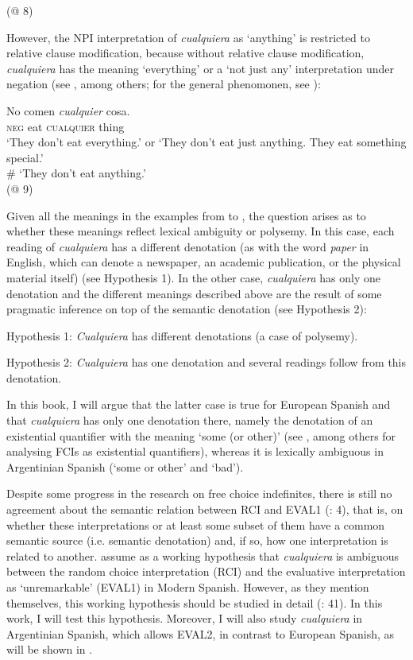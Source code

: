     (@ 8)
\z

However, the NPI interpretation of \textit{cualquiera} as ‘anything’ is restricted to relative clause modification, because without relative clause modification, \textit{cualquiera} has the meaning ‘everything’ or a ‘not just any’ interpretation under negation (see \citealt{Arregui2006}, among others; for the general phenomonen, see \citealt{Chierchia2006}):

\ea \label{ex:key:17}
    \gll No comen \textit{cualquier} cosa.\\
    \textsc{neg} eat \textsc{cualquier} thing\\
    \glt ‘They don’t eat everything.’ or ‘They don’t eat just anything. They eat something special.’\\
    \# ‘They don’t eat anything.’ \\
    (@ 9)
\z

Given all the meanings in the examples from  to , the question arises as to whether these meanings reflect lexical ambiguity or polysemy. In this case, each reading of \textit{cualquiera} has a different denotation (as with the word \textit{paper} in English, which can denote a newspaper, an academic publication, or the physical material itself) (see Hypothesis 1).
In the other case, \textit{cualquiera} has only one denotation and the different meanings described above are the result of some pragmatic inference on top of the semantic denotation (see Hypothesis 2):


\ea \label{ex:key:18}
    Hypothesis 1: \textit{Cualquiera} has different denotations (a case of polysemy).

    Hypothesis 2: \textit{Cualquiera} has one denotation and several readings follow from this denotation.
\z

In this book, I will argue that the latter case is true for European Spanish and that \textit{cualquiera} has only one denotation there, namely the denotation of an existential quantifier with the meaning ‘some (or other)’ (see \citealt{Fălăuş2014,Aloni2021}, among others for analysing FCIs as existential quantifiers), whereas it is lexically ambiguous in Argentinian Spanish (‘some or other’ and ‘bad’).

Despite some progress in the research on free choice indefinites, there is still no agreement about the semantic relation between RCI and EVAL1 (\citealt{am2015}: 4), that is, on whether these interpretations or at least some subset of them have a common semantic source (i.e. semantic denotation) and, if so, how one interpretation is related to another. \citet{Alonso-OvalleMenéndez-Benito2011} assume as a working hypothesis that \textit{cualquiera} is ambiguous between the random choice interpretation (RCI) and the evaluative interpretation as ‘unremarkable’ (EVAL1) in Modern Spanish. However, as they mention themselves, this working hypothesis should be studied in detail (\citealt{Alonso-OvalleMenéndez-Benito2011}: 41). In this work, I will test this hypothesis. Moreover, I will also study \textit{cualquiera} in Argentinian Spanish, which allows EVAL2, in contrast to European Spanish, as will be shown in .

